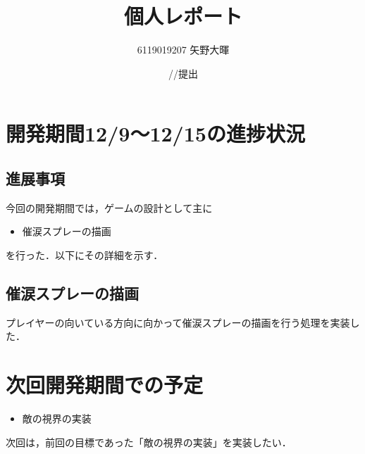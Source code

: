 \documentclass{jarticle}
\title{個人レポート}
\author{6119019207 矢野大暉}
\date{\number\year/\number\month/\number\day 提出}
\newcommand{\xe}{催涙スプレーの描画}
\newcommand{\pitem}[1]{
\item #1
}
\begin{document}
\maketitle

\section{開発期間12/9～12/15の進捗状況} 
\subsection{進展事項}
今回の開発期間では，ゲームの設計として主に
\begin{itemize}
\pitem{\xe}
\end{itemize}
を行った．以下にその詳細を示す．

\subsection{\xe}
プレイヤーの向いている方向に向かって催涙スプレーの描画を行う処理を実装した．

\section{次回開発期間での予定}
\begin{itemize}
\item 敵の視界の実装
\end{itemize}

次回は，前回の目標であった「敵の視界の実装」を実装したい．
\end{document}
